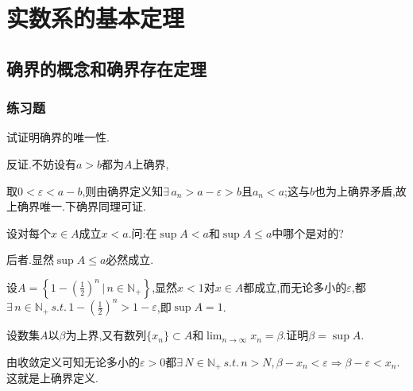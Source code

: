 \documentclass[cn,chinese,fontset]{elegantbook}
\begin{document}
\tableofcontents

\chapter{实数系的基本定理}
 \section{确界的概念和确界存在定理}
  \subsection{练习题}
      \begin{exercise}
          试证明确界的唯一性.
      \end{exercise}
      \begin{solution}
          反证.不妨设有$a>b$都为$A$上确界,

          取$0<\varepsilon<a-b$,则由确界定义知$\exists\, a_n>a-\varepsilon>b$且$a_n<a$;这与$b$也为上确界矛盾,故上确界唯一.下确界同理可证.
      \end{solution}

      \begin{exercise}
          设对每个$x\in A$成立$x<a$.问:在$\sup A<a$和$\sup A\leqslant a$中哪个是对的?
      \end{exercise}

      \begin{solution}
          后者.显然$\sup A\leqslant a$必然成立.

          设$A=\left\{1-(\frac{1}{2})^n\,\bigg\lvert\,n\in \mathbb{N}_+\right\}$,显然$x<1$对$x\in A$都成立,而无论多小的$\varepsilon$,都$\exists\,n\in \mathbb{N}_+\,s.t.\,1-(\frac{1}{2})^n>1-\varepsilon$,即$\sup A=1$.
      \end{solution}

      \begin{exercise}
          设数集$A$以$\beta$为上界,又有数列$\{x_n\}\subset A$和$\lim_{n\to\infty}x_n=\beta.$证明$\beta=\sup A$.
      \end{exercise}

      \begin{solution}
          由收敛定义可知无论多小的$\varepsilon>0$都$\exists\,N\in \mathbb{N}_+\,s.t.\,n>N,\beta-x_n<\varepsilon\Rightarrow\beta-\varepsilon<x_n$.这就是上确界定义.
      \end{solution}
\end{document}
